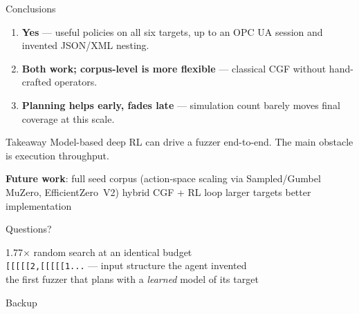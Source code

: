 \documentclass[aspectratio=169,10pt]{beamer}
\newcommand{\code}[1]{\texttt{#1}}
\begin{document}
\begin{frame}{Conclusions}
  \begin{enumerate}
    \item[\textbf{RQ1}] \textbf{Yes} --- useful policies on all six targets,
      up to an OPC UA session and invented JSON/XML nesting.
    \item[\textbf{RQ2}] \textbf{Both work; corpus-level is more flexible}
      --- classical CGF without hand-crafted operators.
    \item[\textbf{RQ3}] \textbf{Planning helps early, fades late} ---
      simulation count barely moves final coverage at this scale.
  \end{enumerate}
  \medskip
  \begin{alertblock}{Takeaway}
    Model-based deep RL can drive a fuzzer end-to-end. The main obstacle is
    execution throughput.
  \end{alertblock}
  \medskip
  \textbf{Future work}: full seed corpus (action-space scaling via
  Sampled/Gumbel MuZero, EfficientZero~V2) \textperiodcentered{}
  hybrid CGF + RL loop \textperiodcentered{} larger targets \textperiodcentered{}
  better implementation
\end{frame}

\begin{frame}[standout]
  Questions?

  \bigskip
  {\small
   \num{1.77}$\times$ random search at an identical budget\\[0.6ex]
   \code{[[[[[2,[[[[[1...} --- input structure the agent invented\\[0.6ex]
   the first fuzzer that plans with a \emph{learned} model of its target}
\end{frame}

\appendix

\begin{frame}[standout]
  Backup
\end{frame}
\end{document}
